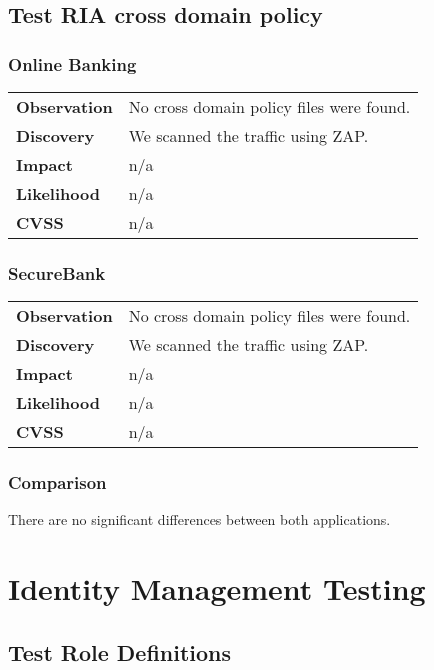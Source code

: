 \clearpage
\subsection{Test RIA cross domain policy}

\subsubsection*{Online Banking}

\begin{tabular}{l|p{10cm}}

\textbf{Observation} & No cross domain policy files were found.  \\
\textbf{Discovery} & We scanned the traffic using ZAP. \\
\textbf{Impact} & n/a \\
\textbf{Likelihood} & n/a \\
\textbf{CVSS} & n/a \\
\end{tabular}

\subsubsection*{SecureBank}

\begin{tabular}{l|p{10cm}}

\textbf{Observation} & No cross domain policy files were found.  \\
\textbf{Discovery} & We scanned the traffic using ZAP. \\
\textbf{Impact} & n/a \\
\textbf{Likelihood} & n/a \\
\textbf{CVSS} & n/a \\
\end{tabular}

\subsubsection*{Comparison}
There are no significant differences between both applications.

\clearpage

\section{Identity Management Testing}

\subsection{Test Role Definitions}

